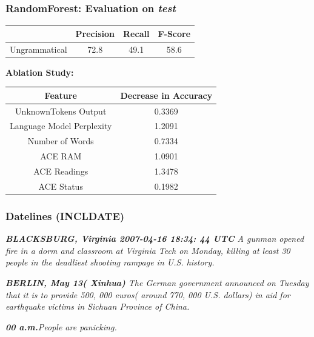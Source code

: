 \documentclass[table]{beamer}
\begin{document}
\begin{frame}
  \frametitle{\textbf{RandomForest}: Evaluation on \textit{test}}
  \quad\quad\begin{tabular}{r|c|c|c|}
  & \textbf{Precision} & \textbf{Recall} & \textbf{F-Score}\\
  \hline
  Ungrammatical & 72.8 & 49.1 & 58.6\\
  \hline
  \end{tabular}
  \vspace{0.5cm}

  \quad\quad\textbf{Ablation Study:}

  \vspace{0.25cm}
  \quad\quad\begin{tabular}{c|c}
  \hline\hline
  Feature & Decrease in Accuracy\\%
  \hline
  UnknownTokens Output & 0.3369\\
  Language Model Perplexity & 1.2091\\
  Number of Words & 0.7334\\
  ACE RAM & 1.0901\\
  ACE Readings & 1.3478\\
  ACE Status & 0.1982\\
  \hline\hline
  \end{tabular}

\end{frame}


\begin{frame}
  \frametitle{Datelines (INCLDATE)}
  \textit{\textbf{BLACKSBURG, Virginia 2007-04-16 18:34: 44 UTC} A gunman opened fire in a dorm and classroom at Virginia Tech on Monday, killing at least 30 people in the deadliest shooting rampage in U.S. history.}
  \vspace{0.5cm}

  \textit{\textbf{BERLIN, May 13( Xinhua)} The German government announced on Tuesday that it is to provide 500, 000 euros( around 770, 000 U.S. dollars) in aid for earthquake victims in Sichuan Province of China.}
  \vspace{0.5cm}

  \textit{\textbf{00 a.m.}People are panicking.}
\end{frame}
\end{document}
